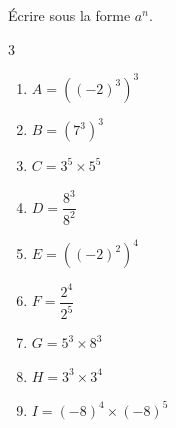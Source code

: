 {\begin{Exercice}
Écrire sous la forme $a^n$.
\vspace{-0.5cm}
\begin{multicols}{3}
\begin{enumerate}[itemsep=1em]
\item \begin{minipage}[t]{\linewidth}$A=((-2)^3)^{3}$\end{minipage}
	\item \begin{minipage}[t]{\linewidth}$B=(7^3)^{3}$\end{minipage}
	\item \begin{minipage}[t]{\linewidth}$C=3^5\times 5^5$\end{minipage}
	\item \begin{minipage}[t]{\linewidth}$D=\dfrac{8^3}{8^2}$\end{minipage}
	\item \begin{minipage}[t]{\linewidth}$E=((-2)^2)^{4}$\end{minipage}
	\item \begin{minipage}[t]{\linewidth}$F=\dfrac{2^4}{2^5}$\end{minipage}
	\item \begin{minipage}[t]{\linewidth}$G=5^3\times 8^3$\end{minipage}
	\item \begin{minipage}[t]{\linewidth}$H=3^3\times 3^4$\end{minipage}
	\item \begin{minipage}[t]{\linewidth}$I=(-8)^4\times (-8)^5$\end{minipage}
\end{enumerate}
\end{multicols}
\vspace{-0.5cm}
\end{Exercice}

}
